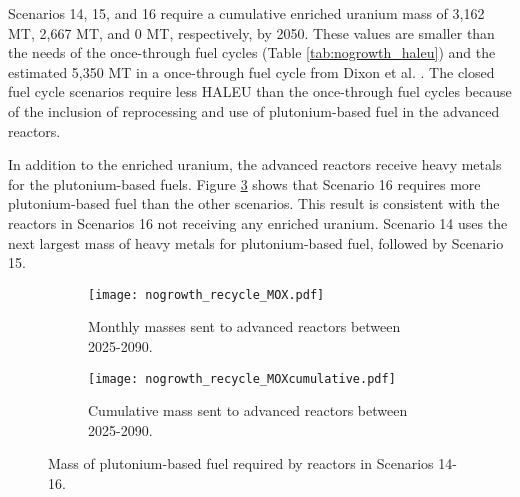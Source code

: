 Scenarios 14, 15, and 16 require a cumulative enriched uranium 
mass of 3,162 MT, 2,667 MT, and 0 MT, respectively, by 2050. These values 
are smaller than the needs of the once-through fuel cycles 
(Table \ref{tab:nogrowth_haleu}) and the estimated 5,350 MT in 
a once-through fuel cycle from 
Dixon et al. \cite{dixon_estimated_2022}. The closed fuel cycle 
scenarios require less \gls{HALEU} than the once-through 
fuel cycles because of the inclusion of reprocessing and use 
of plutonium-based fuel in the advanced reactors. 

In addition to the enriched uranium, the advanced 
reactors receive heavy metals for the plutonium-based 
fuels. Figure 
\ref{fig:nogrowth_recycle_mox} shows that Scenario 16 requires more 
plutonium-based fuel than the other scenarios. This result is consistent 
with the reactors in Scenarios 16 not receiving any enriched 
uranium. Scenario 14 uses the next largest mass of heavy metals for 
plutonium-based fuel, followed by Scenario 15. 

\begin{figure}[h!]
    \centering
    \begin{subfigure}[b]{0.45\textwidth}
        \centering
        \texttt{[image: nogrowth\_recycle\_MOX.pdf]}
        \caption{Monthly masses sent to 
        advanced reactors between 2025-2090.}
        \label{fig:nogrowth_recycle_AR_mox}
    \end{subfigure}
    \hfill
    \begin{subfigure}[b]{0.45\textwidth}
        \centering
        \texttt{[image: nogrowth\_recycle\_MOXcumulative.pdf]}
        \caption{Cumulative mass 
        sent to advanced reactors between 2025-2090.}
        \label{fig:nogrowth_recycle_mox_cumulative}
    \end{subfigure}
       \caption{Mass of plutonium-based fuel required by reactors
        in Scenarios 14-16.}
       \label{fig:nogrowth_recycle_mox}
\end{figure}

